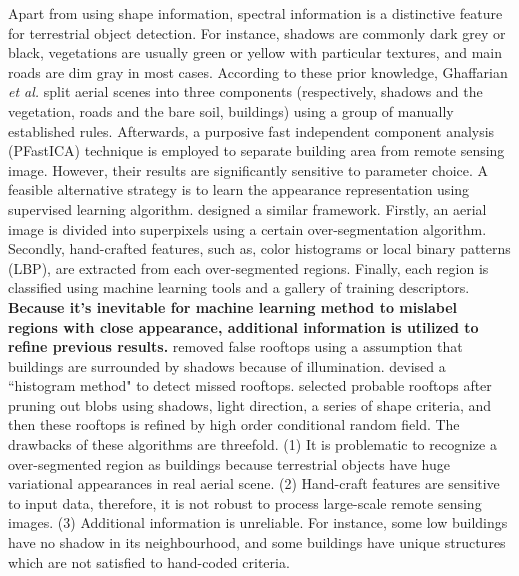 \documentclass[runningheads]{llncs}
\begin{document}
   Apart from using shape information, spectral information is a distinctive feature for  terrestrial object detection. For instance, shadows are commonly dark grey or black, vegetations are usually green or yellow with particular textures, and main roads are dim gray in most cases. According to these prior knowledge, Ghaffarian \textit{et al.} \cite{ghaffarian2014automaticPFICA} split aerial scenes into three components (respectively, shadows and the vegetation, roads and the bare soil, buildings) using a group of manually established rules. Afterwards, a purposive fast independent component analysis (PFastICA) technique is employed to separate building area from remote sensing image. However, their results are significantly sensitive to parameter choice. A feasible alternative strategy is to learn the appearance representation using  supervised learning algorithm. \cite{chen2014shadow}\cite{dornaika2015object}\cite{baluyan2013novel}\cite{ngoautomatic} designed a similar framework. Firstly, an aerial image is divided into superpixels using  a certain over-segmentation algorithm. Secondly, hand-crafted features, such as, color histograms or local binary patterns (LBP), are extracted from each over-segmented regions. Finally, each region is classified using machine learning tools and a gallery of training descriptors. \textbf{ Because it's inevitable for machine learning method to mislabel regions with close appearance, additional information is utilized to refine previous results.} \cite{ngoautomatic} removed false rooftops using a assumption that buildings are surrounded by shadows because of illumination. \cite{baluyan2013novel} devised a ``histogram method" to detect missed rooftops. \cite{li2015robust} selected probable rooftops after pruning out blobs using shadows, light direction, a series of shape criteria, and then these rooftops is refined by high order conditional random field. The drawbacks of these algorithms are threefold. (1) It is problematic to recognize a over-segmented region as buildings because terrestrial objects have huge variational appearances in real aerial scene. (2) Hand-craft features are sensitive to input data, therefore, it is not robust to process large-scale remote sensing images. (3) Additional information is unreliable. For instance, some low buildings have no shadow in its neighbourhood, and some buildings have unique structures which are not satisfied to hand-coded criteria. 
\end{document}

